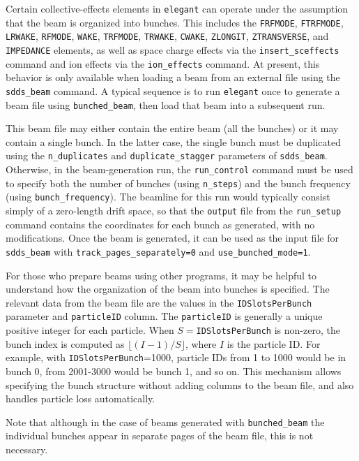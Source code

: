 \documentclass[11pt]{article}
\begin{document}
Certain collective-effects elements in {\tt elegant} can operate under the assumption that the beam is organized into bunches.
This includes the {\tt FRFMODE}, {\tt FTRFMODE}, {\tt LRWAKE}, {\tt RFMODE}, {\tt WAKE}, {\tt TRFMODE}, {\tt TRWAKE}, {\tt CWAKE}, {\tt ZLONGIT}, {\tt ZTRANSVERSE}, and {\tt IMPEDANCE} elements, as well as space charge effects via the \verb|insert_sceffects| command and ion effects via the
\verb|ion_effects| command.
At present, this behavior is only available when loading a beam from an external file using the \verb|sdds_beam| command.
A typical sequence is to run {\tt elegant} once to generate a beam file using \verb|bunched_beam|, then load that beam into a subsequent run.

This beam file may either contain the entire beam (all the bunches) or it may contain a single bunch.
In the latter case, the single bunch must be duplicated using the \verb|n_duplicates| and \verb|duplicate_stagger| parameters of \verb|sdds_beam|.
Otherwise, in the beam-generation run, 
the \verb|run_control| command must be used to specify both the number of bunches (using \verb|n_steps|) and the bunch frequency (using
\verb|bunch_frequency|).
The beamline for this run would typically consist simply of a zero-length drift space, so that the \verb|output| file from the \verb|run_setup| command
contains the coordinates for each bunch as generated, with no modifications.
Once the beam is generated, it can be used as the input file for \verb|sdds_beam| with \verb|track_pages_separately=0| and \verb|use_bunched_mode=1|.

For those who prepare beams using other programs, it may be helpful to understand how the organization of the beam into bunches is specified.
The relevant data from the beam file are the values in the \verb|IDSlotsPerBunch| parameter and \verb|particleID| column.
The \verb|particleID| is generally a unique positive integer for each particle.
When  $S=$\verb|IDSlotsPerBunch| is non-zero, the bunch index is computed as $\lfloor (I-1)/S\rfloor$, where $I$ is the particle ID.
For example, with \verb|IDSlotsPerBunch|=1000, particle IDs from 1 to 1000 would be in bunch 0, from 2001-3000 would be bunch 1, and so on.
This mechanism allows specifying the bunch structure without adding columns to the beam file, and also handles particle loss automatically.

Note that although in the case of beams generated with \verb|bunched_beam| the individual bunches appear in separate pages of the beam file, this is not
necessary.
\end{document}
